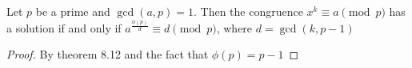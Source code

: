 \begin{corollary}
    Let $p$ be a prime and $\gcd(a, p) = 1$.
    Then the congruence $x^k \equiv a \pmod p$ has a solution
    if and only if $a^{\frac{\phi(p)}{d}} \equiv d \pmod p$,
    where $d = \gcd(k, p-1)$
\end{corollary}
\begin{proof}
    By theorem 8.12 and the fact that $\phi(p) = p-1$
\end{proof}